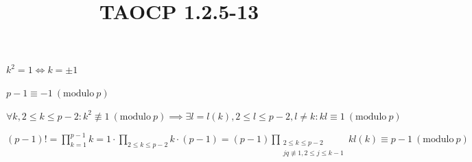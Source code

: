 \documentclass{article}
\title{TAOCP 1.2.5\mbox{-}13}
\begin{document}
\maketitle

\( k^{2} = 1 \iff k = \pm 1 \)

\( p - 1 \equiv -1\ (\mathrm{modulo}\ p) \)

\( \forall k, 2 \leq k \leq p - 2: k^{2} \not\equiv 1\ (\mathrm{modulo}\ p) \implies \exists l = l(k), 2 \leq l \leq p - 2, l \neq k: kl \equiv 1\ (\mathrm{modulo}\ p) \)

\( (p-1)! = \prod_{k=1}^{p-1} k = 1 \cdot \prod_{2 \leq k \leq p - 2} k \cdot (p -1) = (p-1) \prod_{\substack{2 \leq k \leq p - 2\\jq \not\equiv 1, 2 \leq j \leq k - 1}}kl(k) \equiv p - 1 \ (\mathrm{modulo}\ p) \)
\end{document}

